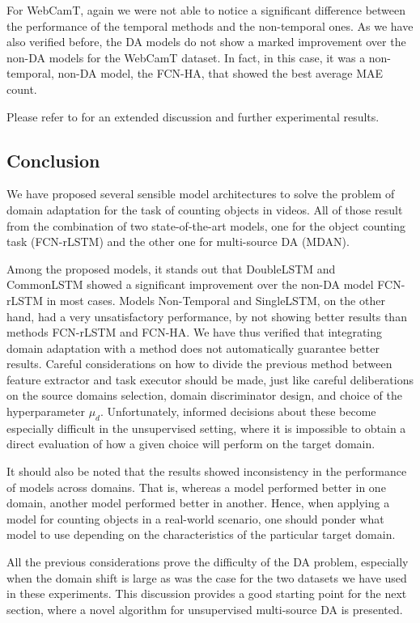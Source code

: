 For WebCamT, again we were not able to notice a significant difference between the performance of the temporal methods and the non-temporal ones. As we have also verified before, the DA models do not show a marked improvement over the non-DA models for the WebCamT dataset. In fact, in this case, it was a non-temporal, non-DA model, the FCN-HA, that showed the best average MAE count.

Please refer to \citet{ThesisFrancisco} for an extended discussion and further experimental results.

\subsection{Conclusion}

We have proposed several sensible model architectures to solve the problem of domain adaptation for the task of counting objects in videos. All of those result from the combination of two state-of-the-art models, one for the object counting task (FCN-rLSTM) and the other one for multi-source DA (MDAN).

Among the proposed models, it stands out that DoubleLSTM and CommonLSTM showed a significant improvement over the non-DA model FCN-rLSTM in most cases. Models Non-Temporal and SingleLSTM, on the other hand, had a very unsatisfactory performance, by not showing better results than methods FCN-rLSTM and FCN-HA. We have thus verified that integrating domain adaptation with a method does not automatically guarantee better results. Careful considerations on how to divide the previous method between feature extractor and task executor should be made, just like careful deliberations on the source domains selection, domain discriminator design, and choice of the hyperparameter $\mu_d$. Unfortunately, informed decisions about these become especially difficult in the unsupervised setting, where it is impossible to obtain a direct evaluation of how a given choice will perform on the target domain.

It should also be noted that the results showed inconsistency in the performance of models across domains. That is, whereas a model performed better in one domain, another model performed better in another. Hence, when applying a model for counting objects in a real-world scenario, one should ponder what model to use depending on the characteristics of the particular target domain.

All the previous considerations prove the difficulty of the DA problem, especially when the domain shift is large as was the case for the two datasets we have used in these experiments. This discussion provides a good starting point for the next section, where a novel algorithm for unsupervised multi-source DA is presented.

